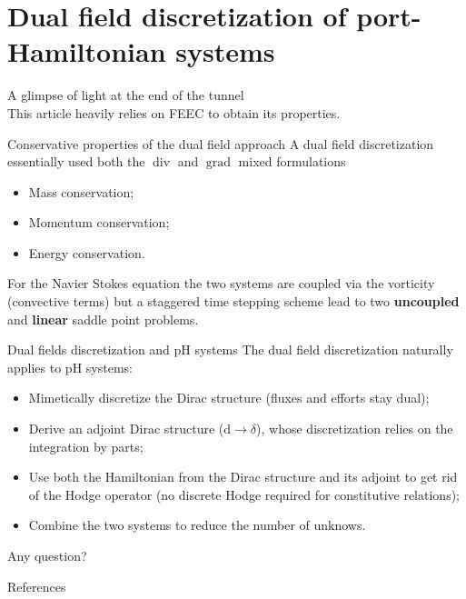 \documentclass[aspectratio=169]{beamer}
\DeclareMathOperator*{\grad}{grad}
\renewcommand{\div}{\operatorname{div}}
\begin{document}
\section{Dual field discretization of port-Hamiltonian systems}

\begin{frame}{A glimpse of light at the end of the tunnel}
	\\
	\vspace{.5cm}
	This article heavily relies on FEEC to obtain its properties.
	\begin{block}{Conservative properties of the dual field approach}
		A dual field discretization essentially used both the $\div$ and $\grad$ mixed formulations
		\begin{itemize}
			\item[\textcolor{green}{\checkmark}] Mass conservation;
			\item[\textcolor{green}{\checkmark}] Momentum conservation;
			\item[\textcolor{green}{\checkmark}] Energy conservation.
		\end{itemize}
		For the Navier Stokes equation the two systems are coupled via the vorticity (convective terms) but a staggered time stepping scheme lead to two \textbf{uncoupled} and \textbf{linear} saddle point problems.
	\end{block}
	
\end{frame}

\begin{frame}{Dual fields discretization and pH systems}
	The dual field discretization naturally applies to pH systems:
	\begin{itemize}
		\item<2-> Mimetically discretize the Dirac structure (fluxes and efforts stay dual);
		\item<3-> Derive an adjoint Dirac structure ($\mathrm{d} \rightarrow \delta$), whose discretization relies on the integration by parts;
		\item<4-> Use both the Hamiltonian from the Dirac structure and its adjoint to get rid of the Hodge operator (no discrete Hodge required for constitutive relations);
		\item<5-> Combine the two systems to reduce the number of unknows.
	\end{itemize}
\end{frame}

\begin{frame}
	\Large Any question?
\end{frame}

\begin{frame}[allowframebreaks]{References}
	\printbibliography
\end{frame}
\end{document}
